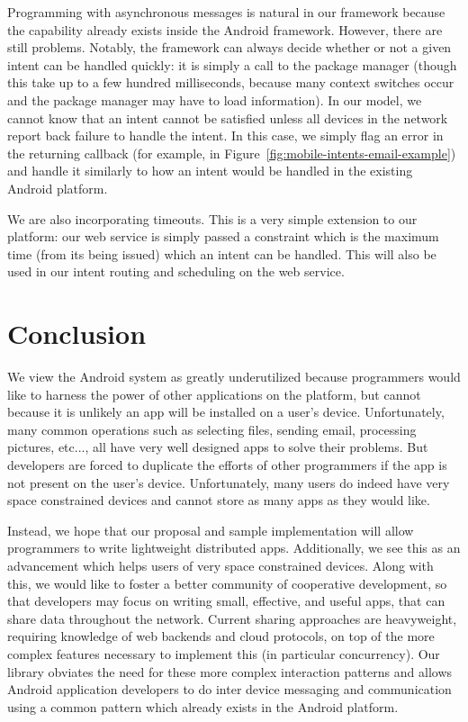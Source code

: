 \documentclass{acm_proc_article-sp}
\begin{document}
Programming with asynchronous messages is natural in our framework
because the capability already exists inside the Android framework.
However, there are still problems.  Notably, the framework can always
decide whether or not a given intent can be handled quickly: it is
simply a call to the package manager (though this take up to a few
hundred milliseconds, because many context switches occur and the
package manager may have to load information).  In our model, we
cannot know that an intent cannot be satisfied unless all devices in
the network report back failure to handle the intent.  In this case,
we simply flag an error in the returning callback (for example, in
Figure~\ref{fig:mobile-intents-email-example}) and handle it similarly
to how an intent would be handled in the existing Android platform.

We are also incorporating timeouts.  This is a very simple extension
to our platform: our web service is simply passed a constraint which
is the maximum time (from its being issued) which an intent can be
handled.  This will also be used in our intent routing and scheduling
on the web service.

\section{Conclusion}
We view the Android system as greatly underutilized because
programmers would like to harness the power of other applications on
the platform, but cannot because it is unlikely an app will be
installed on a user's device.  Unfortunately, many common operations
such as selecting files, sending email, processing pictures, etc...,
all have very well designed apps to solve their problems.  But
developers are forced to duplicate the efforts of other programmers if
the app is not present on the user's device.  Unfortunately, many
users do indeed have very space constrained devices and cannot store
as many apps as they would like.

Instead, we hope that our proposal and sample implementation will
allow programmers to write lightweight distributed apps.
Additionally, we see this as an advancement which helps users of very
space constrained devices.  Along with this, we would like to foster a
better community of cooperative development, so that developers may
focus on writing small, effective, and useful apps, that can share
data throughout the network.  Current sharing approaches are
heavyweight, requiring knowledge of web backends and cloud protocols,
on top of the more complex features necessary to implement this (in
particular concurrency).  Our library obviates the need for these more
complex interaction patterns and allows Android application developers
to do inter device messaging and communication using a common pattern
which already exists in the Android platform.
\end{document}
